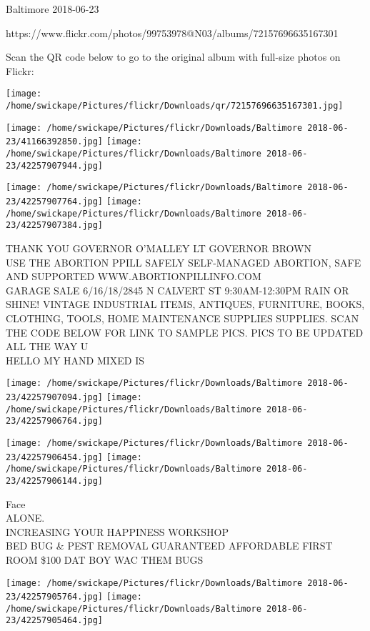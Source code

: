 \documentclass[10pt,letterpaper]{article}
\begin{document}
Baltimore 2018-06-23

https://www.flickr.com/photos/99753978@N03/albums/72157696635167301

Scan the QR code below to go to the original album with full-size photos on Flickr:

\texttt{[image: /home/swickape/Pictures/flickr/Downloads/qr/72157696635167301.jpg]}
\pagebreak

\texttt{[image: /home/swickape/Pictures/flickr/Downloads/Baltimore 2018-06-23/41166392850.jpg]}
\texttt{[image: /home/swickape/Pictures/flickr/Downloads/Baltimore 2018-06-23/42257907944.jpg]}

\texttt{[image: /home/swickape/Pictures/flickr/Downloads/Baltimore 2018-06-23/42257907764.jpg]}
\texttt{[image: /home/swickape/Pictures/flickr/Downloads/Baltimore 2018-06-23/42257907384.jpg]}

THANK YOU GOVERNOR O'MALLEY LT GOVERNOR BROWN\\
USE THE ABORTION PPILL SAFELY SELF{-}MANAGED ABORTION, SAFE AND SUPPORTED WWW.ABORTIONPILLINFO.COM\\
GARAGE SALE 6/16/18/2845 N CALVERT ST 9:30AM{-}12:30PM RAIN OR SHINE!  VINTAGE INDUSTRIAL ITEMS, ANTIQUES, FURNITURE, BOOKS, CLOTHING, TOOLS, HOME MAINTENANCE SUPPLIES SUPPLIES.  SCAN THE CODE BELOW FOR LINK TO SAMPLE PICS.  PICS TO BE UPDATED ALL THE WAY U\\
HELLO MY HAND MIXED IS\\
\pagebreak

\texttt{[image: /home/swickape/Pictures/flickr/Downloads/Baltimore 2018-06-23/42257907094.jpg]}
\texttt{[image: /home/swickape/Pictures/flickr/Downloads/Baltimore 2018-06-23/42257906764.jpg]}

\texttt{[image: /home/swickape/Pictures/flickr/Downloads/Baltimore 2018-06-23/42257906454.jpg]}
\texttt{[image: /home/swickape/Pictures/flickr/Downloads/Baltimore 2018-06-23/42257906144.jpg]}

Face\\
ALONE.\\
INCREASING YOUR HAPPINESS WORKSHOP\\
BED BUG \& PEST REMOVAL GUARANTEED AFFORDABLE FIRST ROOM \$100 DAT BOY WAC THEM BUGS\\
\pagebreak

\texttt{[image: /home/swickape/Pictures/flickr/Downloads/Baltimore 2018-06-23/42257905764.jpg]}
\texttt{[image: /home/swickape/Pictures/flickr/Downloads/Baltimore 2018-06-23/42257905464.jpg]}
\end{document}

